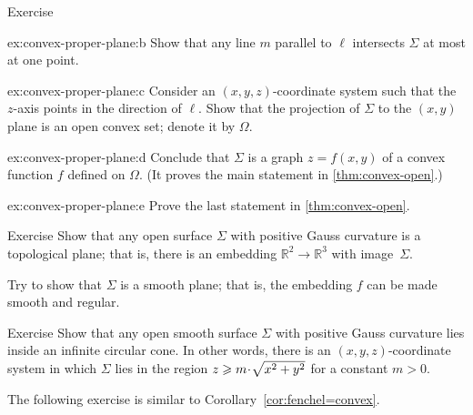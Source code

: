 {\begin{thm}{Exercise}
\begin{subthm}{ex:convex-proper-plane:b}
Show that any line $m$ parallel to $\ell$ intersects $\Sigma$ at most at one point.
\end{subthm}


\begin{subthm}{ex:convex-proper-plane:c}
Consider an $(x,y,z)$-coordinate system such that the $z$-axis points in the direction of $\ell$.
Show that the projection of $\Sigma$ to the $(x,y)$ plane is an open convex set; denote it by $\Omega$.
\end{subthm}

\begin{subthm}{ex:convex-proper-plane:d}
Conclude that $\Sigma$ is a graph $z=f(x,y)$ of a convex function $f$ defined on $\Omega$.
(It proves the main statement in \ref{thm:convex-open}.)
\end{subthm}

\begin{subthm}{ex:convex-proper-plane:e}
Prove the last statement in \ref{thm:convex-open}.
\end{subthm}


\end{thm}



}

\begin{thm}{Exercise}\label{ex:open+convex=plane}
Show that any open surface $\Sigma$ with positive Gauss curvature is a topological plane;
that is, there is an embedding $\mathbb{R}^2\to\mathbb{R}^3$ with image~$\Sigma$.

Try to show that $\Sigma$ is a smooth plane;
that is, the embedding $f$ can be made smooth and regular.
\end{thm}

\begin{thm}{Exercise}\label{ex:circular-cone}
Show that any open smooth surface $\Sigma$ with positive Gauss curvature
lies inside an infinite circular cone. In other words, there is an $(x,y,z)$-coordinate system in which $\Sigma$ lies in the region $z \z\ge m \cdot\sqrt{x^2 + y^2}$ for a constant $m > 0$.
\end{thm} 

The following exercise is similar to Corollary~\ref{cor:fenchel=convex}.

